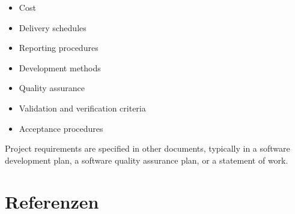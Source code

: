 {\begin{itemize}
	\begin{itemize}
	\item Cost
	\item Delivery schedules
	\item Reporting procedures
	\item Development methods
	\item Quality assurance
	\item Validation and verification criteria
	\item Acceptance procedures
	\end{itemize}
Project requirements are specified in other documents, typically in a software development plan, a software quality assurance plan, or a statement of work.
\end{itemize}
\clearpage
}

\newpage
	

	{\linespread{1.0} \tableofcontents}
	\newpage
	
		
	\newpage
		
    
    \listoffigures
        
    \listoftables
			
	
	
	
	
	
	
	
	\appendix
	
	\newpage
	
	\section{Referenzen}
	\label{anx:ref}
	\renewcommand{\refname}{} %
	\vspace{-1.2cm}
	
	\nocite{*} %
	
	
